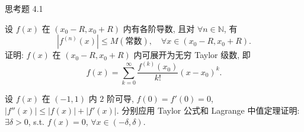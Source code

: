 \begin{exblock}{思考题 4.1}
  \item 设 $f(x)$ 在 $(x_{0}-R,x_{0}+R)$ 内有各阶导数, 且对 $\forall n\in\mathbb{N}$, 有
  \[
  |f^{(n)}(x)|\leqslant M(\text{常数}),\quad \forall x\in(x_{0}-R,x_{0}+R).
\]
  证明: $f(x)$ 在 $(x_{0}-R,x_{0}+R)$ 内可展开为无穷 Taylor 级数, 即
  \[
  f(x)=\sum_{k=0}^{\infty}\frac{f^{(k)}(x_{0})}{k!}(x-x_{0})^{k}.
\]

  \item 设 $f(x)$ 在 $(-1,1)$ 内 $2$ 阶可导, $f(0)=f'(0)=0$, $|f''(x)|\leqslant |f(x)|+|f'(x)|$. 分别应用 Taylor 公式和 Lagrange 中值定理证明: $\exists \delta>0$, s.t. $f(x)=0$, $\forall x\in(-\delta,\delta)$.
\end{exblock}
